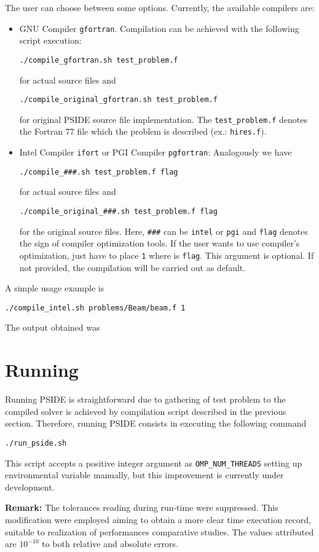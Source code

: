 \documentclass[a4paper,11pt]{article}
\theoremstyle{comm}
\begin{document}
The user can choose between some options. Currently, the available compilers are:
\begin{itemize}
\item GNU Compiler \texttt{gfortran}. Compilation can be achieved with the following script execution:

\begin{Verbatim}[frame=single]
./compile_gfortran.sh test_problem.f
\end{Verbatim}
for actual source files and
\begin{Verbatim}[frame=single]
./compile_original_gfortran.sh test_problem.f
\end{Verbatim}
for original PSIDE source file implementation. The \texttt{test\_problem.f} denotes the Fortran 77 file which the problem is described (ex.: \texttt{hires.f}).

\item Intel Compiler \texttt{ifort} or PGI Compiler \texttt{pgfortran}: Analogously we have

\begin{Verbatim}[frame=single]
./compile_###.sh test_problem.f flag
\end{Verbatim}
for actual source files and
\begin{Verbatim}[frame=single]
./compile_original_###.sh test_problem.f flag
\end{Verbatim}
for the original source files. Here, \texttt{\#\#\#} can be \texttt{intel} or \texttt{pgi} and \texttt{flag} denotes the sign of compiler optimization tools. If the user wants to use compiler's optimization, just have to place \texttt{1} where is \texttt{flag}. This argument is optional. If not provided, the compilation will be carried out as default.

\end{itemize}

A simple usage example is
\begin{Verbatim}[frame=single]
./compile_intel.sh problems/Beam/beam.f 1
\end{Verbatim}

The output obtained was


\section{Running}

Running PSIDE is straightforward due to gathering of test problem to the compiled solver is achieved by compilation script described in the previous section. Therefore, running PSIDE consists in executing the following command
\begin{Verbatim}[frame=single]
./run_pside.sh
\end{Verbatim}

This script accepts a positive integer argument as 
\texttt{OMP\_NUM\_THREADS} 
setting up environmental variable manually, but this improvement is currently under development.

\textbf{Remark:} The tolerances reading during run-time were suppressed. This modification were employed aiming to obtain a more clear time execution record, suitable to realization of performances comparative studies. The values attributed are $10^{-10}$ to both relative and absolute errors.
\end{document}
